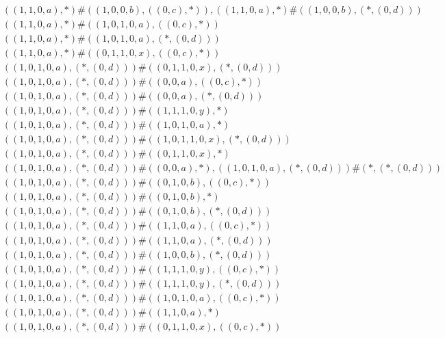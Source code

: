 \begin{align*}
	 & \qquad ((1, 1, 0, a), *) \# ((1, 0, 0, b), ((0, c), *)), ((1, 1, 0, a), *) \# ((1, 0, 0, b), (*, (0, d))) \\ 
	 & \qquad ((1, 1, 0, a), *) \# ((1, 0, 1, 0, a), ((0, c), *)) \\ 
	 & \qquad ((1, 1, 0, a), *) \# ((1, 0, 1, 0, a), (*, (0, d))) \\ 
	 & \qquad ((1, 1, 0, a), *) \# ((0, 1, 1, 0, x), ((0, c), *)) \\ 
	 & \qquad ((1, 0, 1, 0, a), (*, (0, d))) \# ((0, 1, 1, 0, x), (*, (0, d))) \\ 
	 & \qquad ((1, 0, 1, 0, a), (*, (0, d))) \# ((0, 0, a), ((0, c), *)) \\ 
	 & \qquad ((1, 0, 1, 0, a), (*, (0, d))) \# ((0, 0, a), (*, (0, d))) \\ 
	 & \qquad ((1, 0, 1, 0, a), (*, (0, d))) \# ((1, 1, 1, 0, y), *) \\ 
	 & \qquad ((1, 0, 1, 0, a), (*, (0, d))) \# ((1, 0, 1, 0, a), *) \\ 
	 & \qquad ((1, 0, 1, 0, a), (*, (0, d))) \# ((1, 0, 1, 1, 0, x), (*, (0, d))) \\ 
	 & \qquad ((1, 0, 1, 0, a), (*, (0, d))) \# ((0, 1, 1, 0, x), *) \\ 
	 & \qquad ((1, 0, 1, 0, a), (*, (0, d))) \# ((0, 0, a), *), ((1, 0, 1, 0, a), (*, (0, d))) \# (*, (*, (0, d))) \\ 
	 & \qquad ((1, 0, 1, 0, a), (*, (0, d))) \# ((0, 1, 0, b), ((0, c), *)) \\ 
	 & \qquad ((1, 0, 1, 0, a), (*, (0, d))) \# ((0, 1, 0, b), *) \\ 
	 & \qquad ((1, 0, 1, 0, a), (*, (0, d))) \# ((0, 1, 0, b), (*, (0, d))) \\ 
	 & \qquad ((1, 0, 1, 0, a), (*, (0, d))) \# ((1, 1, 0, a), ((0, c), *)) \\ 
	 & \qquad ((1, 0, 1, 0, a), (*, (0, d))) \# ((1, 1, 0, a), (*, (0, d))) \\ 
	 & \qquad ((1, 0, 1, 0, a), (*, (0, d))) \# ((1, 0, 0, b), (*, (0, d))) \\ 
	 & \qquad ((1, 0, 1, 0, a), (*, (0, d))) \# ((1, 1, 1, 0, y), ((0, c), *)) \\ 
	 & \qquad ((1, 0, 1, 0, a), (*, (0, d))) \# ((1, 1, 1, 0, y), (*, (0, d))) \\ 
	 & \qquad ((1, 0, 1, 0, a), (*, (0, d))) \# ((1, 0, 1, 0, a), ((0, c), *)) \\ 
	 & \qquad ((1, 0, 1, 0, a), (*, (0, d))) \# ((1, 1, 0, a), *) \\ 
	 & \qquad ((1, 0, 1, 0, a), (*, (0, d))) \# ((0, 1, 1, 0, x), ((0, c), *)) \\ 

\end{align*}
